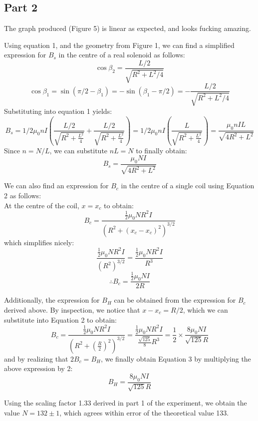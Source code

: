 \documentclass[letterpaper]{article}
\begin{document}
\subsection{Part 2}


The graph produced (Figure 5) is linear as expected, and looks fucking amazing.



Using equation 1, and the geometry from Figure 1, we can find a simplified expression for $B_s$ in the centre of a real solenoid as follows:
$$ \cos{\beta_2} = \frac{L/2}{\sqrt{R^2+L^2/4}}$$
$$ \cos{\beta_1} = \sin{(\pi/2 - \beta_1)} = -\sin{(\beta_1-\pi/2)} = -\frac{L/2}{\sqrt{R^2+L^2/4}}  $$
Substituting into equation 1 yields:
$$ B_s = 1/2 \mu_0nI \left(\frac{L/2}{\sqrt{R^2+\frac{L^2}{4}}} + \frac{L/2}{\sqrt{R^2+\frac{L^2}{4}}} \right) =  1/2\mu_0nI \left(\frac{L}{\sqrt{R^2+\frac{L^2}{4}}} \right)= \frac{\mu_0nIL}{\sqrt{4R^2+L^2}}$$
Since $n=N/L$, we can substitute $nL=N$ to finally obtain:
$$ B_s= \frac{\mu_0NI}{\sqrt{4R^2+L^2}} $$

We can also find an expression for $B_c$ in the centre of a single coil using Equation 2 as follows:\\
At the centre of the coil, $x=x_c$ to obtain:
$$ B_c = \frac{\frac{1}{2} \mu_0NR^2I}{(R^2+(x_c-x_c)^2)^{3/2}} $$
which simplifies nicely:
$$ \frac{\frac{1}{2} \mu_0NR^2I}{(R^2)^{3/2}} = \frac{\frac{1}{2} \mu_0NR^2I}{R^3}  $$
$$ \therefore B_c = \frac{\frac{1}{2} \mu_0NI}{2R} $$

Additionally, the expression for $B_H$ can be obtained from the expression for $B_c$ derived above. By inspection,
we notice that $x-x_c=R/2$, which we can substitute into Equation 2 to obtain:
$$ B_c= \frac{\frac{1}{2}\mu_0NR^2I}{(R^2+(\frac{R}{2})^2)^{3/2}} = \frac{\frac{1}{2}\mu_0NR^2I}{\frac{\sqrt{125}}{8}R^3} = \frac{1}{2}\times \frac{8\mu_0NI}{\sqrt{125}R} $$
and by realizing that $2B_c=B_H$, we finally obtain Equation 3 by multiplying the above expression by 2:
$$B_H=\frac{8\mu_0NI}{\sqrt{125}R}$$

Using the scaling factor 1.33 derived in part 1 of the experiment, we obtain the value $N=132 \pm 1$,
which agrees within error of the theoretical value 133.
\end{document}
